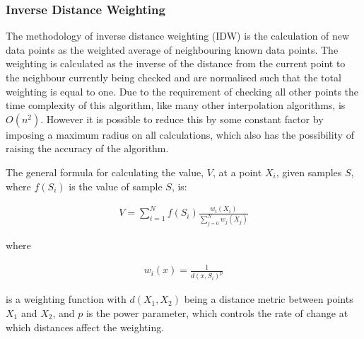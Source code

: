         \subsubsection{Inverse Distance Weighting}\label{background_interpolation_methods_inverse_distance_weighting}

            The methodology of inverse distance weighting (IDW) is the calculation of new data points as the weighted average of neighbouring known data points. The weighting is calculated as the inverse of the distance from the current point to the neighbour currently being checked and are normalised such that the total weighting is equal to one. Due to the requirement of checking all other points the time complexity of this algorithm, like many other interpolation algorithms, is $O(n^{2})$. However it is possible to reduce this by some constant factor by imposing a maximum radius on all calculations, which also has the possibility of raising the accuracy of the algorithm.

            The general formula for calculating the value, $V$, at a point $X_{i}$, given samples $S$, where $f(S_{i})$ is the value of sample $S$, is:

            \begin{align*}
                V = \sum_{i=1}^{N}{f(S_{i})\frac{w_{i}(X_{i})}{\sum_{j=0}^{N}{w_{j}(X_{j})}}}
            \end{align*}

            where 

            \begin{align*}
                w_{i}(x) = \frac{1}{d(x,S_{i})^{p}}
            \end{align*}

            is a weighting function with $d(X_{1},X_{2})$ being a distance metric between points $X_{1}$ and $X_{2}$, and $p$ is the power parameter, which controls the rate of change at which distances affect the weighting.


